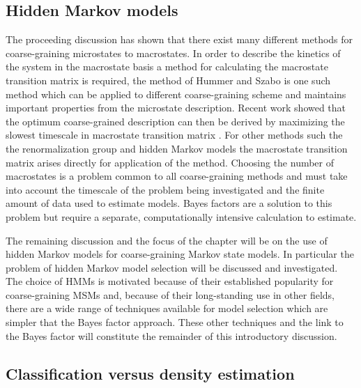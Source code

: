 \subsection{Hidden Markov models}

The proceeding discussion has shown that there exist many different methods for coarse-graining microstates to macrostates. In order to describe the kinetics of the system in the macrostate basis a method for calculating the macrostate transition matrix is required, the method of Hummer and Szabo \cite{hummerOptimalDimensionalityReduction2015a} is one such method which can be applied to different coarse-graining scheme and maintains important properties from the microstate description. Recent work showed that the optimum coarse-grained description can then be derived by maximizing the slowest timescale in macrostate transition matrix \cite{kellsCorrelationFunctionsMean2020, kellsMeanFirstPassage2019}. For other methods such the the renormalization group \cite{orioliDimensionalReductionMarkov2016c} and hidden Markov models \cite{noeProjectedHiddenMarkov2013a} the macrostate transition matrix arises directly for application of the method. Choosing the number of macrostates is a problem common to all coarse-graining methods and must take into account the timescale of the problem being investigated and the finite amount of data used to estimate models. Bayes factors are a solution to this problem but require a separate, computationally intensive calculation to estimate. 

The remaining discussion and the focus of the chapter will be on the use of hidden Markov models for coarse-graining Markov state models.  In particular the problem of hidden Markov model selection will be discussed and investigated. The choice of HMMs is motivated because of their established popularity for coarse-graining MSMs and, because of their long-standing use in other fields, there are a wide range of techniques available for model selection which are simpler that the Bayes factor approach. These other techniques and the link to the Bayes factor will constitute the remainder of this introductory discussion. 


\subsection{Classification versus density estimation}

